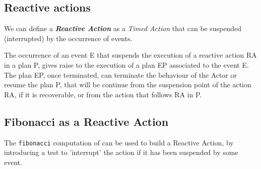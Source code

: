  \newpage 
\subsection{Reactive actions}
We can define a \textit{\textbf{Reactive Action}} as a \textit{Timed Action} that can be suspended (interrupted) by the occurrence of events.  

The occurrence of an event E that suspends the execution of a reactive action RA in a plan P, gives raise to the execution of a plan EP associated to the event E. The plan EP, once terminated, can terminate the behaviour of the Actor or resume the plan P, that will be continue from the suspension point of the action RA, if it is recoverable, or from the action that follows RA in P.



 

\subsection{Fibonacci as a Reactive Action}

 
The \texttt{fibonacci} computation of  can be used to build a Reactive Action, by introducing a test to 'interrupt' the action if it has been suspended by some event.

